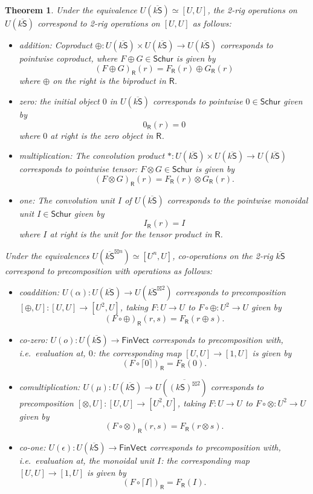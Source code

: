 \documentclass[12pt,reqno]{amsart}
\theoremstyle{plain}
\newtheorem{thm}{Theorem}
\theoremstyle{definition}
\theoremstyle{remark}
\newcommand{\maps}{\colon}
\newcommand{\category}[1]{\mathsf{#1}}
\newcommand{\R}{\category R}
\renewcommand{\S}{\category S}
\newcommand{\namedcat}[1]{\mathsf{#1}}
\newcommand{\Schur}{\namedcat{Schur}}
\newcommand{\Vect}{\namedcat{Vect}}
\newcommand{\Fin}{\namedcat{Fin}}
\numberwithin{thm}{section}
\begin{document}
\begin{thm}
\label{thm:schur_2-birig}
    Under the equivalence $U(\overline{k \S}) \simeq [U, U]$, the 2-rig operations on $U(\overline{k \S})$ correspond to 2-rig operations on $[U, U]$ as follows: 
    \begin{itemize}
        \item addition: Coproduct $\oplus \maps U(\overline{k \S}) \times U(\overline{k \S}) \to U(\overline{k \S})$ corresponds to pointwise coproduct, where $F \oplus G \in \Schur$ is given by
        \[   (F \oplus G)_\R(r)   = F_\R(r) \oplus G_\R(r) \]
        where $\oplus$ on the right is the biproduct in $\R$.
        \item zero: the initial object $0$ in $U(\overline{k \S})$ corresponds to pointwise $0 \in \Schur$ given by
        \[    0_\R(r) = 0  \]
        where $0$ at right is the zero object in $\R$.
        \item multiplication: The convolution product $\ast \maps U(\overline{k \S}) \times U(\overline{k \S}) \to U(\overline{k \S})$ corresponds to pointwise tensor: $F \otimes G \in \Schur$ is given by
        \[    (F \otimes G)_\R(r) = F_\R(r) \otimes G_\R(r) .\]
        \item one: The convolution unit $I$ of $U(\overline{k \S})$ corresponds to the pointwise monoidal unit $I \in \Schur$ given by
        \[    I_\R(r) = I  \]
        where $I$ at right is the unit for the tensor product in $\R$.
    \end{itemize}
    Under the equivalences $U(\overline{k \S}^{\boxtimes n}) \simeq [U^n, U]$, co-operations on the 2-rig $\overline{k \S}$ correspond to precomposition with operations as follows:
    \begin{itemize}
        \item coaddition: $U(\alpha) \maps U(\overline{k \S}) \to U(\overline{k \S}^{\boxtimes 2})$ corresponds to precomposition $[\oplus, U]\colon [U, U] \to [U^2, U]$, taking $F \maps U \to U$ to $F \circ \oplus \maps U^2 \to U$ given by
        \[   
            (F \circ \oplus)_{\R}(r, s) = F_\R(r \oplus s).
        \]
        \item co-zero: $U(o) \maps U(\overline{k \S}) \to \Fin\Vect$ corresponds to precomposition with, i.e.\ evaluation at, $0$: the corresponding map $[U, U] \to [1, U]$ is given by
        \[    
            (F \circ \lceil 0 \rceil)_\R = F_\R(0).
        \]
        \item comultiplication: $U(\mu) \colon U(\overline{k \S}) \to U(\overline{(k \S)^{\boxtimes 2}})$ corresponds to precomposition $[\otimes, U] \colon [U, U] \to [U^2, U]$, taking $F \maps U \to U$ to $F \circ \otimes \maps U^2 \to U$ given by  
        \[  
            (F \circ \otimes)_{\R}(r, s) = F_\R(r \otimes s). 
        \]
        \item co-one: $U(\epsilon) \maps U(\overline{k \S}) \to \Fin\Vect$ corresponds to precomposition with, i.e.\ evaluation at, the monoidal unit $I$: the corresponding map $[U, U] \to [1, U]$ is given by 
        \[    
            (F \circ \lceil I \rceil)_\R = F_\R(I).
        \]
    \end{itemize}
\end{thm}
\end{document}
